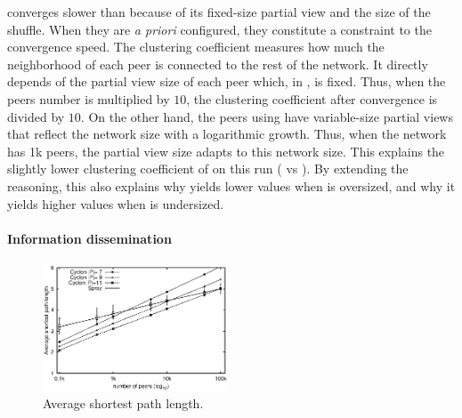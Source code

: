 \begin{asparadesc}
  converges slower than \SPRAY because of its fixed-size partial view and the
  size of the shuffle. When they are \emph{a priori} configured, they constitute
  a constraint to the convergence speed.  The clustering coefficient measures
  how much the neighborhood of each peer is connected to the rest of the
  network. It directly depends of the partial view size of each peer which, in
  \CYCLON, is fixed. Thus, when the peers number is multiplied by $10$, the
  clustering coefficient after convergence is divided by $10$. On the other
  hand, the peers using \SPRAY have variable-size partial views that reflect the
  network size with a logarithmic growth. Thus, when the network has 1k peers,
  the partial view size adapts to this network size. This explains the slightly
  lower clustering coefficient of \SPRAY on this run ( vs ). By extending the reasoning, this also explains why \SPRAY yields lower
  values when \CYCLON is oversized, and why it yields higher values when \CYCLON
  is undersized.
\end{asparadesc}

\paragraph{Information dissemination}

\begin{figure}
  \centering
  \includegraphics[width=0.49\textwidth]{img/avgpath.eps}
  \caption{\label{fig:avgpath}Average shortest path length.}
\end{figure}

